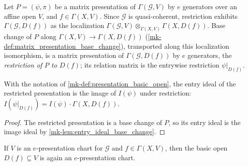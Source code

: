 \begin{definition}
  \label{mk-def:presentation_basic_open}
  \leanok

  Let \(P = (\psi, \pi)\) be a matrix presentation of
  \(\Gamma(\mathcal G, V)\) by \(e\) generators over an affine open \(V\), and
  \(f \in \Gamma(X, V)\).  Since \(\mathcal G\) is quasi-coherent, restriction
  exhibits \(\Gamma(\mathcal G, D(f))\) as the localization
  \(\Gamma(\mathcal G, V) \otimes_{\Gamma(X, V)} \Gamma(X, D(f))\).  Base
  change of \(P\) along \(\Gamma(X, V) \to \Gamma(X, D(f))\)
  (\ref{mk-def:matrix_presentation_base_change}), transported along this
  localization isomorphism, is a matrix presentation of
  \(\Gamma(\mathcal G, D(f))\) by \(e\) generators, the \emph{restriction of
  \(P\) to \(D(f)\)}; its relation matrix is the entrywise restriction
  \(\psi|_{D(f)}\).
\end{definition}

\begin{lemma}
  \label{mk-lem:entry_ideal_basic_open}
  \leanok

  With the notation of \ref{mk-def:presentation_basic_open}, the entry ideal of
  the restricted presentation is the image of \(I(\psi)\) under restriction:
  \(I(\psi|_{D(f)}) = I(\psi) \cdot \Gamma(X, D(f))\).
\end{lemma}

\begin{proof}
  \leanok
  The restricted presentation is a base change of \(P\), so its entry ideal is
  the image ideal by \ref{mk-lem:entry_ideal_base_change}.
\end{proof}

\begin{lemma}
  \label{mk-lem:presentation_chart_basic_open}
  \leanok

  If \(V\) is an \(e\)-presentation chart for \(\mathcal G\) and
  \(f \in \Gamma(X, V)\), then the basic open \(D(f) \subseteq V\) is again an
  \(e\)-presentation chart.
\end{lemma}

